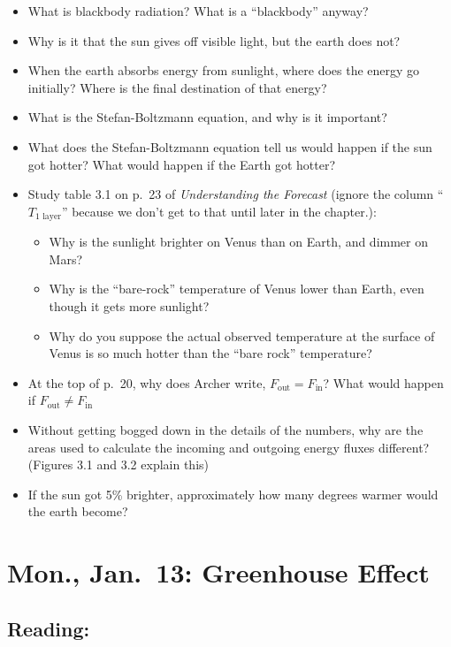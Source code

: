 \documentclass[
]{article}
\providecommand{\tightlist}{%
  \setlength{\itemsep}{0pt}\setlength{\parskip}{0pt}}
\begin{document}
\begin{itemize}
\item
  What is blackbody radiation? What is a ``blackbody'' anyway?
\item
  Why is it that the sun gives off visible light, but the earth does
  not?
\item
  When the earth absorbs energy from sunlight, where does the energy go
  initially? Where is the final destination of that energy?
\item
  What is the Stefan-Boltzmann equation, and why is it important?
\item
  What does the Stefan-Boltzmann equation tell us would happen if the
  sun got hotter? What would happen if the Earth got hotter?
\item
  Study table 3.1 on p.~23 of \emph{Understanding the Forecast} (ignore
  the column ``\(T_{\text{1 layer}}\)'' because we don't get to that
  until later in the chapter.):

  \begin{itemize}
  \tightlist
  \item
    Why is the sunlight brighter on Venus than on Earth, and dimmer on
    Mars?
  \item
    Why is the ``bare-rock'' temperature of Venus lower than Earth, even
    though it gets more sunlight?
  \item
    Why do you suppose the actual observed temperature at the surface of
    Venus is so much hotter than the ``bare rock'' temperature?
  \end{itemize}
\item
  At the top of p.~20, why does Archer write,
  \(F_{\text{out}} = F_{\text{in}}\)? What would happen if
  \(F_{\text{out}} \ne F_{\text{in}}\)
\item
  Without getting bogged down in the details of the numbers, why are the
  areas used to calculate the incoming and outgoing energy fluxes
  different? (Figures 3.1 and 3.2 explain this)
\item
  If the sun got 5\% brighter, approximately how many degrees warmer
  would the earth become?
\end{itemize}

\hypertarget{mon.-jan.-13-greenhouse-effect}{%
\section{Mon., Jan.~13: Greenhouse
Effect}\label{mon.-jan.-13-greenhouse-effect}}

\hypertarget{reading-3}{%
\subsection{Reading:}\label{reading-3}}
\end{document}
